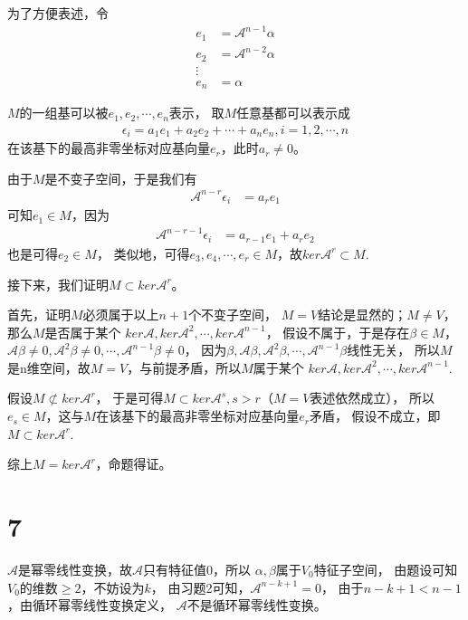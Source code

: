 \documentclass{article}
\begin{document}
为了方便表述，令
\begin{align*}
  e_1 & = \mathscr{A}^{n-1} \alpha \\
  e_2 & = \mathscr{A}^{n-2} \alpha \\
  \vdots                           \\
  e_n & = \alpha
\end{align*}

$M$的一组基可以被$e_1, e_2, \cdots, e_n$表示，
取$M$任意基都可以表示成
\begin{align*}
  \epsilon_i = a_1 e_1 + a_2 e_2 + \cdots + a_n e_n, i = 1, 2, \cdots, n
\end{align*}
在该基下的最高非零坐标对应基向量$e_r$，此时$a_r \neq 0$。

由于$M$是不变子空间，于是我们有
\begin{align*}
  \mathscr{A}^{n - r} \epsilon_i & = a_r e_1
\end{align*}
可知$e_1 \in M$，因为
\begin{align*}
  \mathscr{A}^{n - r - 1} \epsilon_i
   & = a_{r - 1} e_1 + a_r e_2
\end{align*}
也是可得$e_2 \in M$，
类似地，可得$e_3, e_4, \cdots, e_r \in M$，故$ker \mathscr{A}^{r} \subset M$.

接下来，我们证明$M \subset ker \mathscr{A}^{r}$。

首先，证明$M$必须属于以上$n + 1$个不变子空间，
$M = V$结论是显然的；$M \neq V$，那么$M$是否属于某个
$ker \mathscr{A}, ker \mathscr{A}^{2}, \cdots, ker \mathscr{A}^{n - 1}$，
假设不属于，于是存在$\beta \in M$，
$\mathscr{A} \beta \neq 0, \mathscr{A}^{2} \beta \neq 0, \cdots, \mathscr{A}^{n - 1} \beta \neq 0$，
因为$\beta, \mathscr{A} \beta, \mathscr{A}^{2} \beta, \cdots, \mathscr{A}^{n - 1} \beta$线性无关，
所以$M$是n维空间，故$M = V$，与前提矛盾，所以$M$属于某个
$ker \mathscr{A}, ker \mathscr{A}^{2}, \cdots, ker \mathscr{A}^{n - 1}$.

假设$M \not \subset ker \mathscr{A}^{r}$，
于是可得$M \subset ker \mathscr{A}^{s}, s > r$（$M = V$表述依然成立），
所以$e_s \in M$，这与$M$在该基下的最高非零坐标对应基向量$e_r$矛盾，
假设不成立，即$M \subset ker \mathscr{A}^{r}$.

综上$M = ker \mathscr{A}^{r}$，命题得证。

\section*{7}

$\mathscr{A}$是幂零线性变换，故$\mathscr{A}$只有特征值0，所以
$\alpha, \beta$属于$V_0$特征子空间，
由题设可知$V_0$的维数$\geq 2$，不妨设为$k$，
由习题2可知，$\mathscr{A}^{n - k + 1} = 0$，
由于$n - k + 1 < n - 1$，由循环幂零线性变换定义，
$\mathscr{A}$不是循环幂零线性变换。
\end{document}
